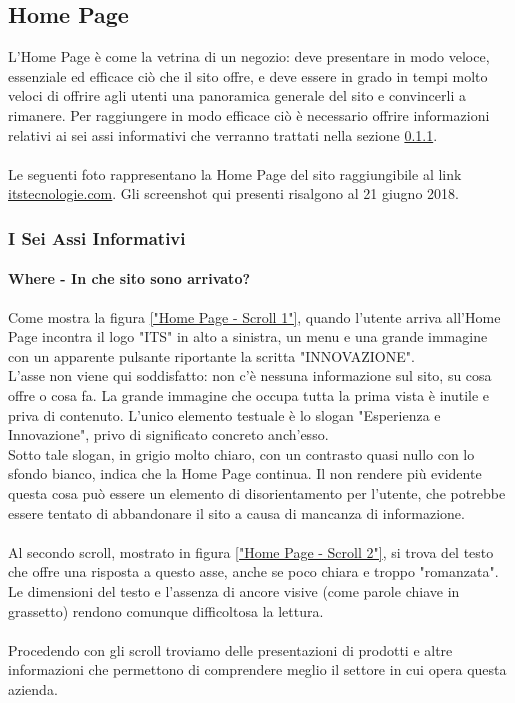 \subsection{Home Page}
L'Home Page è come la vetrina di un negozio: deve presentare in modo veloce, essenziale ed efficace ciò che il sito offre, e deve essere in grado in tempi molto veloci di offrire agli utenti una panoramica generale del sito e convincerli a rimanere. 
Per raggiungere in modo efficace ciò è necessario offrire informazioni relativi ai sei assi informativi che verranno trattati nella sezione \ref{6w}.\\
 \\
Le seguenti foto rappresentano la Home Page del sito raggiungibile al link \url{itstecnologie.com}. Gli screenshot qui presenti risalgono al 21 giugno 2018.

\subsubsection{I Sei Assi Informativi}\label{6w}

\paragraph{Where - In che sito sono arrivato?}
Come mostra la figura \ref{"Home Page - Scroll 1"}, quando l'utente arriva all'Home Page incontra il logo "ITS" in alto a sinistra, un menu e una grande immagine con un apparente pulsante riportante la scritta "INNOVAZIONE". \\
L'asse non viene qui soddisfatto: non c'è nessuna informazione sul sito, su cosa offre o cosa fa. La grande immagine che occupa tutta la prima vista è inutile e priva di contenuto. L'unico elemento testuale è lo slogan "Esperienza e Innovazione", privo di significato concreto anch'esso. \\
Sotto tale slogan, in grigio molto chiaro, con un contrasto quasi nullo con lo sfondo bianco, indica che la Home Page continua. Il non rendere più evidente questa cosa può essere un elemento di disorientamento per l'utente, che potrebbe essere tentato di abbandonare il sito a causa di mancanza di informazione.\\ \\
Al secondo scroll, mostrato in figura \ref{"Home Page - Scroll 2"}, si trova del testo che offre una risposta a questo asse, anche se poco chiara e troppo "romanzata". Le dimensioni del testo e l'assenza di ancore visive (come parole chiave in grassetto) rendono comunque difficoltosa la lettura. \\
\\
Procedendo con gli scroll troviamo delle presentazioni di prodotti e altre informazioni che permettono di comprendere meglio il settore in cui opera questa azienda.
